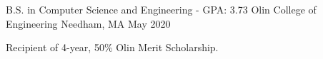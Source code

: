 

\begin{cventries}

  \cventry
    {B.S. in Computer Science and Engineering - GPA: 3.73} %
    {Olin College of Engineering} %
    {Needham, MA} %
    {May 2020} %
    {
      \begin{cvitems} %
        \item {Recipient of 4-year, 50\% Olin Merit Scholarship.}
      \end{cvitems}
    }

\end{cventries}
